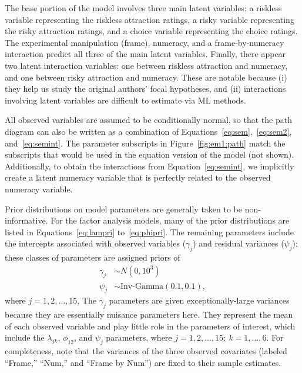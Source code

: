 The base portion of the model involves three main latent variables: a riskless variable representing the riskless attraction ratings, a risky variable representing the risky attraction ratings, and a choice variable representing the choice ratings.  The experimental manipulation (frame), numeracy, and a frame-by-numeracy interaction predict all three of the main latent variables.  Finally, there appear two latent interaction variables: one between riskless attraction and numeracy, and one between risky attraction and numeracy.  These are notable because (i) they help us study the original authors' focal hypotheses, and (ii) interactions involving latent variables are difficult to estimate via ML methods.

 All observed variables are assumed to be conditionally normal, so that the path diagram can also be written as a combination of Equations~\eqref{eq:sem},~\eqref{eq:sem2}, and~\eqref{eq:semint}.  The parameter subscripts in Figure~\ref{fig:em1:path} match the subscripts that would be used in the equation version of the model (not shown). Additionally, to obtain the interactions from Equation~\eqref{eq:semint}, we implicitly create a latent numeracy variable that is perfectly related to the observed numeracy variable.

Prior distributions on model parameters are generally taken to be non-informative.  For the factor analysis models, many of the prior distributions are listed in Equations~\eqref{eq:lampri} to~\eqref{eq:phipri}.  The remaining parameters include the intercepts associated with observed variables ($\gamma_j$) and residual variances ($\psi_j$); these classes of parameters are assigned priors of
\begin{align}
    \gamma_j &\sim N(0, 10^3) \\
    \psi_j &\sim \text{Inv-Gamma}(0.1,0.1), 
\end{align}
where $j=1, 2, \ldots, 15$.  The $\gamma_j$ parameters are given exceptionally-large variances because they are essentially nuisance parameters here.  They represent the mean of each observed variable and play little role in the parameters of interest, which include the $\lambda_{jk}$, $\phi_{12}$, and $\psi_{j}$ parameters, where $j=1, 2, \ldots, 15;\ k=1, \ldots, 6$.  For completeness, note that the variances of the three observed covariates (labeled ``Frame,'' ``Num,'' and ``Frame by Num'') are fixed to their sample estimates.

